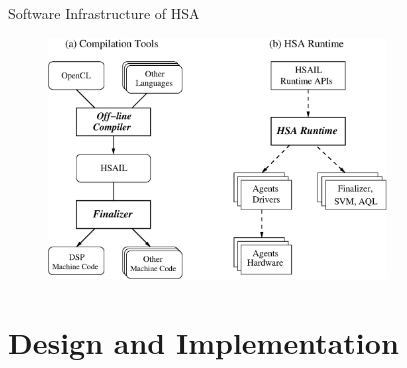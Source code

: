 \documentclass{beamer}
\begin{document}
\begin{CJK}{UTF8}{bkai}
    \begin{frame}{Software Infrastructure of HSA}
        \begin{figure}[!ht] 
            \centering
            \includegraphics[width=0.8\textwidth]{./figs/swinf.eps}
            \label{fig:swinf}
        \end{figure}
    \end{frame}


    \section{Design and Implementation}


\end{CJK}
\end{document}
